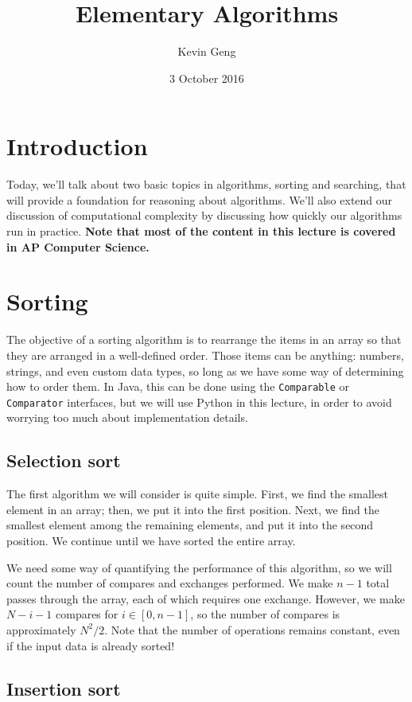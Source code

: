 \documentclass{article}
\title{Elementary Algorithms}
\author{Kevin Geng}
\date{3 October 2016}
\begin{document}
\maketitle

\section{Introduction}

Today, we'll talk about two basic topics in algorithms, sorting and searching, that will provide a foundation for reasoning about algorithms. We'll also extend our discussion of computational complexity by discussing how quickly our algorithms run in practice. \textbf{Note that most of the content in this lecture is covered in AP Computer Science.}


\section{Sorting}

The objective of a sorting algorithm is to rearrange the items in an array so that they are arranged in a well-defined order. Those items can be anything: numbers, strings, and even custom data types, so long as we have some way of determining how to order them. In Java, this can be done using the \texttt{Comparable} or \texttt{Comparator} interfaces, but we will use Python in this lecture, in order to avoid worrying too much about implementation details.


\subsection{Selection sort}

The first algorithm we will consider is quite simple. First, we find the smallest element in an array; then, we put it into the first position. Next, we find the smallest element among the remaining elements, and put it into the second position. We continue until we have sorted the entire array.

We need some way of quantifying the performance of this algorithm, so we will count the number of compares and exchanges performed. We make $n-1$ total passes through the array, each of which requires one exchange. However, we make $N-i-1$ compares for $i \in [0, n-1]$, so the number of compares is approximately $N^2/2$. Note that the number of operations remains constant, even if the input data is already sorted!


\subsection{Insertion sort}
\end{document}
